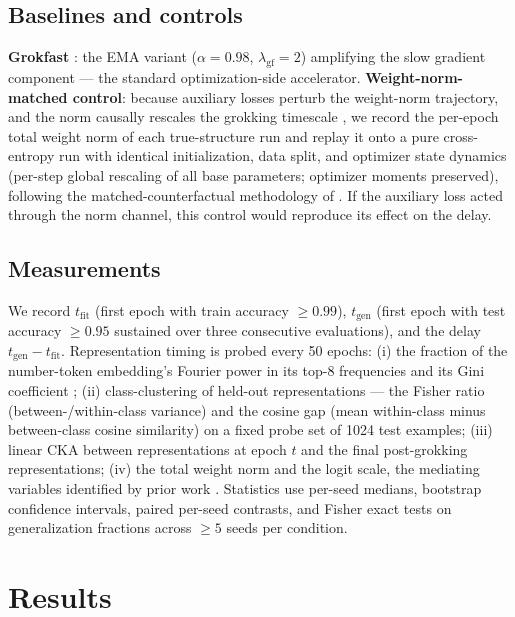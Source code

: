 \documentclass[11pt]{article}
\newcommand{\ttest}{t_{\mathrm{fit}}}
\newcommand{\tgen}{t_{\mathrm{gen}}}
\begin{document}
\subsection{Baselines and controls}
\textbf{Grokfast} \citep{lee2024grokfast}: the EMA variant ($\alpha=0.98$, $\lambda_{\mathrm{gf}}=2$)
amplifying the slow gradient component --- the standard optimization-side accelerator.
\textbf{Weight-norm-matched control}: because auxiliary losses perturb the weight-norm trajectory,
and the norm causally rescales the grokking timescale \citep{weightnormdelay2026}, we record the
per-epoch total weight norm of each true-structure run and replay it onto a pure cross-entropy run
with identical initialization, data split, and optimizer state dynamics (per-step global rescaling
of all base parameters; optimizer moments preserved), following the matched-counterfactual
methodology of \citet{weightnormdelay2026}. If the auxiliary loss acted through the norm channel,
this control would reproduce its effect on the delay.

\subsection{Measurements}
We record $\ttest$ (first epoch with train accuracy $\geq 0.99$), $\tgen$ (first epoch with test
accuracy $\geq 0.95$ sustained over three consecutive evaluations), and the delay
$\tgen-\ttest$. Representation timing is probed every 50 epochs: (i) the fraction of the
number-token embedding's Fourier power in its top-8 frequencies and its Gini coefficient
\citep{nanda2023progress}; (ii) class-clustering of held-out representations --- the Fisher ratio
(between-/within-class variance) and the cosine gap (mean within-class minus between-class cosine
similarity) on a fixed probe set of 1024 test examples; (iii) linear CKA \citep{kornblith2019cka}
between representations at epoch $t$ and the final post-grokking representations; (iv) the total
weight norm and the logit scale, the mediating variables identified by prior work
\citep{weightnormdelay2026, logitscale2026}. Statistics use per-seed medians, bootstrap confidence
intervals, paired per-seed contrasts, and Fisher exact tests on generalization fractions across
$\geq 5$ seeds per condition.

\section{Results}
\end{document}
